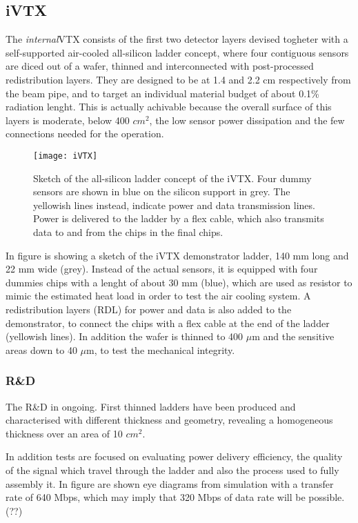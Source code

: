 \subsection{iVTX}

The \textit{internal}VTX consists of the first two detector layers devised togheter with a self-supported air-cooled all-silicon ladder concept, where four contiguous sensors are diced out of a wafer, thinned and interconnected with post-processed redistribution layers. They are designed to be at 1.4 and 2.2 cm respectively from the beam pipe, and to target an individual material budget of about 0.1\% radiation lenght. This is actually achivable because the overall surface of this layers is moderate, below 400 $cm^{2}$, the low sensor power dissipation and the few connections needed for the operation.  



\begin{figure}[h!]
\centering
\texttt{[image: iVTX]}
\caption{Sketch of the all-silicon ladder concept of the iVTX. Four dummy sensors are shown in blue on the silicon support in grey. The yellowish lines instead, indicate power and data transmission lines. Power is delivered to the ladder by a flex cable, which also transmits data to and from the chips in the final chips.}
\label{fig:iVTX}
\end{figure}

In figure  is showing a sketch of the iVTX demonstrator ladder, 140 mm long and 22 mm wide (grey). Instead of the actual sensors, it is equipped with four dummies chips with a lenght of about 30 mm (blue), which are used as resistor to mimic the estimated heat load in order to test the air cooling system. A redistribution layers (RDL) for power and data is also added to the demonstrator, to connect the chips with a flex cable at the end of the ladder (yellowish lines). In addition the wafer is thinned to 400 $\mu$m and the sensitive areas down to 40 $\mu$m, to test the mechanical integrity.

\subsubsection{R\&D}

The R\&D in ongoing. First thinned ladders have been produced and characterised with different thickness and geometry, revealing a homogeneous thickness over an area of 10 $cm^{2}$. 

In addition tests are focused on evaluating power delivery efficiency, the quality of the signal which travel through the ladder and also the process used to fully assembly it. 
In figure  are shown eye diagrams from simulation with a transfer rate of 640 Mbps, which may imply that 320 Mbps of data rate will be possible. (??) 

